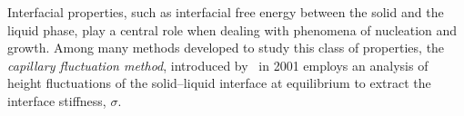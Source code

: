 



Interfacial properties, such as interfacial free energy between the solid and the liquid phase, play a central role when dealing with phenomena of nucleation and growth. Among many methods developed to study this class of properties, the \textit{capillary fluctuation method}, introduced by~\textcite{HoytPRL2001:CFM} in 2001 employs an analysis of height fluctuations of the solid--liquid interface at equilibrium to extract the interface stiffness, $\sigma$.

